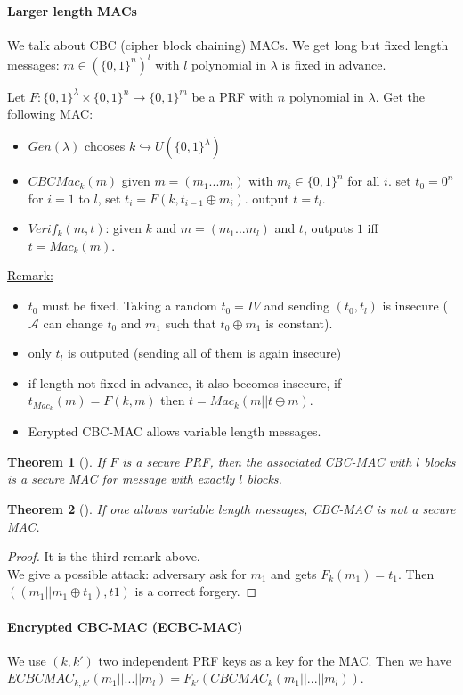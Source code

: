 \documentclass{article}
\newtheorem{thm}{Theorem}[section]
\newcommand{\Thm}[3]{\begin{thm}[#1]\label{#2}#3\end{thm}}
\newcommand{\Rem}{\underline{Remark:} }
\newcommand{\A}{\mathcal{A}}
\newcommand{\bit}{\{0,1\}}
\begin{document}
\paragraph{Larger length MACs} We talk about CBC (cipher block chaining) MACs. We get long but fixed length messages: $m\in(\bit^n)^l$ with $l$ polynomial in $\lambda$ is fixed in advance.

Let $F:\bit^\lambda\times\bit^n\rightarrow\bit^m$ be a PRF with $n$ polynomial in $\lambda$. Get the following MAC:\begin{itemize}
\item $Gen(\lambda)$ chooses $k\hookrightarrow U(\bit^\lambda)$
\item $CBCMac_k(m)$ given $m=(m_1...m_l)$ with $m_i\in\bit^n$ for all $i$.
\subitem set $t_0=0^n$
\subitem for $i=1$ to $l$, set $t_i=F(k,t_{i-1}\oplus m_i)$.
\subitem output $t=t_l$.
\item $Verif_k(m,t)$: given $k$ and $m=(m_1...m_l)$ and $t$, outputs $1$ iff $t=Mac_k(m)$.
\end{itemize} 

\Rem \begin{itemize}
\item $t_0$ must be fixed. Taking a random $t_0=IV$ and sending $(t_0,t_l)$ is insecure ($\A$ can change $t_0$ and $m_1$ such that $t_0\oplus m_1$ is constant). 
\item only $t_l$ is outputed (sending all of them is again insecure)
\item if length not fixed in advance, it also becomes insecure, if $t_{Mac_k}(m)=F(k,m)$ then $t=Mac_k(m||t\oplus m)$. 
\item Ecrypted CBC-MAC allows variable length messages.
\end{itemize}

\Thm{}{thm:CBCMACsecure}{If $F$ is a secure PRF, then the associated CBC-MAC with $l$ blocks is a secure MAC for message with exactly $l$ blocks.}

\Thm{}{thm:CBCMACunsecure}{If one allows variable length messages, CBC-MAC is not a secure MAC.}

\begin{proof}
It is the third remark above.\\
We give a possible attack: adversary ask for $m_1$ and gets $F_k(m_1)=t_1$. Then $((m_1||m_1\oplus t_1),t1)$ is a correct forgery.
\end{proof}

\paragraph{Encrypted CBC-MAC (ECBC-MAC)} We use $(k,k')$ two independent PRF keys as a key for the MAC. Then we have $ECBCMAC_{k,k'}(m_1||...||m_l)=F_{k'}(CBCMAC_k(m_1||...||m_l))$.
\end{document}
